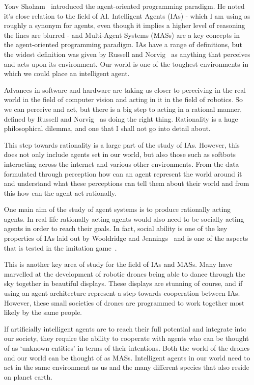 \documentclass[]{final_report}
\begin{document}
Yoav Shoham~\cite{shoham1993agent} introduced the agent-oriented programming paradigm. He noted it's close relation to the field of AI. Intelligent Agents (IAs) - which I am using as roughly a synonym for agents, even though it implies a higher level of reasoning the lines are blurred - and Multi-Agent Systems (MASs) are a key concepts in the agent-oriented programming paradigm. IAs have a range of definitions, but the widest definition was given by Russell and Norvig~\cite{russell2016artificial} as anything that perceives and acts upon its environment. Our world is one of the toughest environments in which we could place an intelligent agent.\par
Advances in software and hardware are taking us closer to perceiving in the real world in the field of computer vision and acting in it in the field of robotics. So we can perceive and act, but there is a big step to acting in a rational manner, defined by Russell and Norvig~\cite{russell2016artificial} as doing the right thing. Rationality is a huge philosophical dilemma, and one that I shall not go into detail about.\par
This step towards rationality is a large part of the study of IAs. However, this does not only include agents set in our world, but also those such as softbots interacting across the internet and various other environments. From the data formulated through perception how can an agent represent the world around it and understand what these perceptions can tell them about their world and from this how can the agent act rationally.\par
One main aim of the study of agent systems is to produce rationally acting agents. In real life rationally acting agents would also need to be socially acting agents in order to reach their goals. In fact, social ability is one of the key properties of IAs laid out by Wooldridge and Jennings~\cite{wooldridge_jennings_1995} and is one of the aspects that is tested in the imitation game~\cite{machinery1950computing}.\par
This is another key area of study for the field of IAs and MASs. Many have marvelled at the development of robotic drones being able to dance through the sky together in beautiful displays. These displays are stunning of course, and if using an agent architecture represent a step towards cooperation between IAs. However, these small societies of drones are programmed to work together most likely by the same people.\par
If artificially intelligent agents are to reach their full potential and integrate into our society, they require the ability to cooperate with agents who can be thought of as `unknown entities' in terms of their intentions. Both the world of the drones and our world can be thought of as MASs. Intelligent agents in our world need to act in the same environment as us and the many different species that also reside on planet earth.\par
\end{document}

